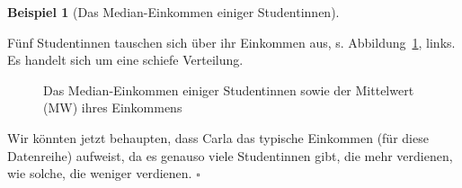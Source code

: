 \documentclass[
  letterpaper,
]{scrbook}
\theoremstyle{definition}
\newtheorem{example}{Beispiel}[chapter]
\theoremstyle{definition}
\theoremstyle{definition}
\theoremstyle{remark}
\begin{document}
\begin{example}[Das Median-Einkommen einiger
Studentinnen]\protect\hypertarget{exm-med}{}\label{exm-med}

Fünf Studentinnen tauschen sich über ihr Einkommen aus, s.
Abbildung~\ref{fig-md1}, links. Es handelt sich um eine schiefe
Verteilung.

\begin{figure}

\begin{minipage}{\linewidth}



\end{minipage}%
\newline
\begin{minipage}{\linewidth}



\end{minipage}%

\caption{\label{fig-md1}Das Median-Einkommen einiger Studentinnen sowie
der Mittelwert (MW) ihres Einkommens}

\end{figure}%

Wir könnten jetzt behaupten, dass Carla das typische Einkommen (für
diese Datenreihe) aufweist, da es genauso viele Studentinnen gibt, die
mehr verdienen, wie solche, die weniger verdienen. \(\square\)

\end{example}
\end{document}
